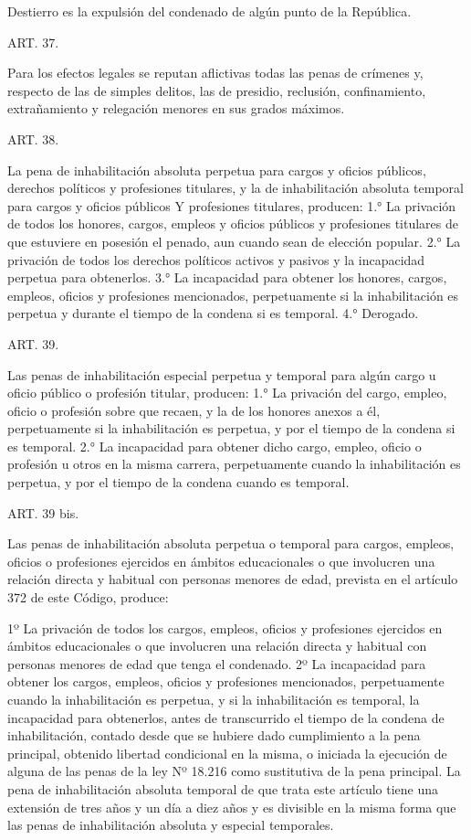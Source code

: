     Destierro es la expulsión del condenado de algún punto de la República.




    ART. 37.

    Para los efectos legales se reputan aflictivas todas las penas de crímenes y, respecto de las de simples delitos, las de presidio, reclusión, confinamiento, extrañamiento y relegación menores en sus grados máximos.


    ART. 38.

    La pena de inhabilitación absoluta perpetua para cargos y oficios públicos, derechos políticos y profesiones titulares, y la de inhabilitación absoluta temporal para cargos y oficios públicos Y profesiones titulares, producen:
    1.° La privación de todos los honores, cargos, empleos y oficios públicos y profesiones titulares de que estuviere en posesión el penado, aun cuando sean de elección popular.
    2.° La privación de todos los derechos políticos activos y pasivos y la incapacidad perpetua para obtenerlos.
    3.° La incapacidad para obtener los honores, cargos, empleos, oficios y profesiones mencionados, perpetuamente si la inhabilitación es perpetua y durante el tiempo de la condena si es temporal.
    4.° Derogado.




    ART. 39.

    Las penas de inhabilitación especial perpetua y temporal para algún cargo u oficio público o profesión titular, producen:
    1.° La privación del cargo, empleo, oficio o profesión sobre que recaen, y la de los honores anexos a él, perpetuamente si la inhabilitación es perpetua, y por el tiempo de la condena si es temporal.
    2.° La incapacidad para obtener dicho cargo, empleo, oficio o profesión u otros en la misma carrera, perpetuamente cuando la inhabilitación es perpetua, y por el tiempo de la condena cuando es temporal.

    ART. 39 bis.

    Las penas de inhabilitación absoluta perpetua o temporal para cargos, empleos, oficios o profesiones ejercidos en ámbitos educacionales o que involucren una relación directa y habitual con personas menores de edad, prevista en el artículo 372 de este Código, produce:

    1º La privación de todos los cargos, empleos, oficios y profesiones ejercidos en ámbitos educacionales o que involucren una relación directa y habitual con personas menores de edad que tenga el condenado.
    2º La incapacidad para obtener los cargos, empleos, oficios y profesiones mencionados, perpetuamente cuando la inhabilitación es perpetua, y si la inhabilitación es temporal, la incapacidad para obtenerlos, antes de transcurrido el tiempo de la condena de inhabilitación, contado desde que se hubiere dado cumplimiento a la pena principal, obtenido libertad condicional en la misma, o iniciada la ejecución de alguna de las penas de la ley Nº 18.216 como sustitutiva de la pena principal.
    La pena de inhabilitación absoluta temporal de que trata este artículo tiene una extensión de tres años y un día a diez años y es divisible en la misma forma que las penas de inhabilitación absoluta y especial temporales.


